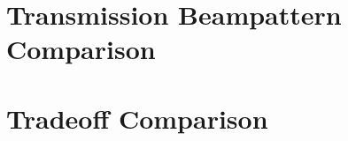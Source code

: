 \section{Transmission Beampattern Comparison}\label{sec:beampattern_compare}
  
\newpage

\section{Tradeoff Comparison}\label{sec:tradeoff_compare}
  


%    
